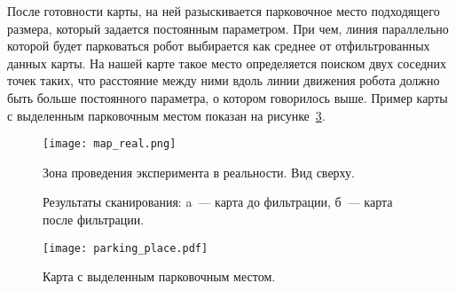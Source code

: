 После готовности карты, на ней разыскивается парковочное место подходящего размера, который задается постоянным параметром. При чем, линия параллельно которой будет парковаться робот выбирается как среднее от отфильтрованных данных карты. На нашей карте такое место определяется поиском двух соседних точек таких, что расстояние между ними вдоль линии движения робота должно быть больше постоянного параметра, о котором говорилось выше. Пример карты с выделенным парковочным местом показан на рисунке~\ref{parking_place}.

\begin{figure}[h]
	\centering
	\texttt{[image: map\_real.png]}
	\caption{Зона проведения эксперимента в реальности. Вид сверху.}
	\label{map_real}
\end{figure}

\begin{figure}[h!]
	\caption{Результаты сканирования: a~--- карта до фильтрации, б~--- карта после фильтрации.}
	\label{map}
\end{figure}

\begin{figure}[h]
	\centering\texttt{[image: parking\_place.pdf]}
	\caption{Карта с выделенным парковочным местом.}
	\label{parking_place}
\end{figure}

\clearpage


